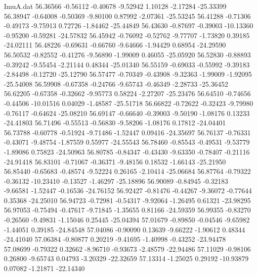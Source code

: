 \begin{filecontents}{ImuA.dat}
  56.36566   -0.56112   -0.40678   -9.52942    1.10128   -2.17284  -25.33399
  56.38947   -0.64008   -0.50369   -9.80100    0.87992   -2.07361  -25.53245
  56.41288   -0.71306   -0.49173   -9.75913    0.72726   -1.84462  -25.44849
  56.43630   -0.87697   -0.39003  -10.13360   -0.95200   -0.59281  -24.57832
  56.45942   -0.76092   -0.52762   -9.77707   -1.73820    0.39185  -24.02111
  56.48226   -0.69631   -0.66760   -9.64666   -1.94429    0.68954  -24.29590
  56.50532   -0.82552   -0.41276   -9.56890   -1.99009    0.46055  -25.05920
  56.52830   -0.88893   -0.39242   -9.55454   -2.21144    0.48344  -25.01340
  56.55159   -0.69033   -0.55992   -9.39183   -2.84498   -0.12720  -25.12790
  56.57477   -0.70349   -0.43908   -9.32363   -1.99009   -1.92095  -25.54008
  56.59908   -0.67358   -0.24766   -9.65743   -0.46349   -2.28733  -25.36452
  56.62205   -0.67358   -0.32662   -9.95773    0.58224   -2.27207  -25.23476
  56.64510   -0.74656   -0.44506  -10.01516    0.04029   -1.48587  -25.51718
  56.66822   -0.72622   -0.32423   -9.79980   -0.76117   -0.64624  -25.08210
  56.69147   -0.66640   -0.39003   -9.50190   -1.08176    0.13233  -24.41803
  56.71496   -0.55513   -0.56830   -9.58206   -1.08176    0.17812  -24.04401
  56.73788   -0.60778   -0.51924   -9.71486   -1.52447    0.09416  -24.35697
  56.76137   -0.76331   -0.43071   -9.48754   -1.87559    0.55977  -24.55543
  56.78460   -0.85543   -0.49531   -9.53779   -1.89086    0.75823  -24.50963
  56.80785   -0.84347   -0.43430   -9.63350   -0.78407   -0.21116  -24.91418
  56.83101   -0.71067   -0.36371   -9.48156    0.18532   -1.66143  -25.21950
  56.85440   -0.65683   -0.48574   -9.52224    0.26165   -2.10414  -25.06684
  56.87764   -0.79322   -0.36132  -10.23410   -0.13527   -1.46297  -25.18896
  56.90089   -0.84945   -0.32183   -9.66581   -1.52447   -0.16536  -24.76152
  56.92427   -0.81476   -0.44267   -9.36072   -0.77644    0.35368  -24.25010
  56.94723   -0.72981   -0.54317   -9.92064   -1.26495    0.61321  -23.98295
  56.97053   -0.75494   -0.47617   -9.71845   -1.35655    0.81166  -24.59359
  56.99355   -0.83270   -0.26560   -9.49831   -1.15046    0.25445  -25.04394
  57.01679   -0.89850   -0.04546   -9.65982   -1.44051    0.39185  -24.84548
  57.04086   -0.90090    0.13639   -9.66222   -1.90612    0.48344  -24.41040
  57.06384   -0.80877    0.20219   -9.41695   -1.40998   -0.43252  -23.94478
  57.08699   -0.79322    0.32662   -8.96710   -0.93673   -2.48579  -22.94486
  57.11029   -0.98106    0.26800   -9.65743    0.04793   -3.20329  -22.32659
  57.13314   -1.25025    0.29192  -10.93879    0.07082   -1.21871  -22.14340

\end{filecontents}
